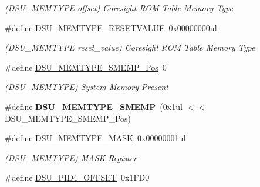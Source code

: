 \begin{DoxyCompactItemize}
\begin{DoxyCompactList}\small\item\em (D\+S\+U\+\_\+\+M\+E\+M\+T\+Y\+P\+E offset) Coresight R\+O\+M Table Memory Type \end{DoxyCompactList}\item 
\hypertarget{group___s_a_m_l21___d_s_u_gae696aac50623781af5c363bb4819a651}{}\#define \hyperlink{group___s_a_m_l21___d_s_u_gae696aac50623781af5c363bb4819a651}{D\+S\+U\+\_\+\+M\+E\+M\+T\+Y\+P\+E\+\_\+\+R\+E\+S\+E\+T\+V\+A\+L\+U\+E}~0x00000000ul\label{group___s_a_m_l21___d_s_u_gae696aac50623781af5c363bb4819a651}

\begin{DoxyCompactList}\small\item\em (D\+S\+U\+\_\+\+M\+E\+M\+T\+Y\+P\+E reset\+\_\+value) Coresight R\+O\+M Table Memory Type \end{DoxyCompactList}\item 
\hypertarget{group___s_a_m_l21___d_s_u_gaf9e3cd3a0a5383eb7790554b6b26b2d3}{}\#define \hyperlink{group___s_a_m_l21___d_s_u_gaf9e3cd3a0a5383eb7790554b6b26b2d3}{D\+S\+U\+\_\+\+M\+E\+M\+T\+Y\+P\+E\+\_\+\+S\+M\+E\+M\+P\+\_\+\+Pos}~0\label{group___s_a_m_l21___d_s_u_gaf9e3cd3a0a5383eb7790554b6b26b2d3}

\begin{DoxyCompactList}\small\item\em (D\+S\+U\+\_\+\+M\+E\+M\+T\+Y\+P\+E) System Memory Present \end{DoxyCompactList}\item 
\hypertarget{group___s_a_m_l21___d_s_u_gaab193425e2e460aea861c9c2ef10fd42}{}\#define {\bfseries D\+S\+U\+\_\+\+M\+E\+M\+T\+Y\+P\+E\+\_\+\+S\+M\+E\+M\+P}~(0x1ul $<$$<$ D\+S\+U\+\_\+\+M\+E\+M\+T\+Y\+P\+E\+\_\+\+S\+M\+E\+M\+P\+\_\+\+Pos)\label{group___s_a_m_l21___d_s_u_gaab193425e2e460aea861c9c2ef10fd42}

\item 
\hypertarget{group___s_a_m_l21___d_s_u_ga1452bd6135db23612661a14aba71c287}{}\#define \hyperlink{group___s_a_m_l21___d_s_u_ga1452bd6135db23612661a14aba71c287}{D\+S\+U\+\_\+\+M\+E\+M\+T\+Y\+P\+E\+\_\+\+M\+A\+S\+K}~0x00000001ul\label{group___s_a_m_l21___d_s_u_ga1452bd6135db23612661a14aba71c287}

\begin{DoxyCompactList}\small\item\em (D\+S\+U\+\_\+\+M\+E\+M\+T\+Y\+P\+E) M\+A\+S\+K Register \end{DoxyCompactList}\item 
\hypertarget{group___s_a_m_l21___d_s_u_ga9b2486d7ffbc473daa210a53c58ae205}{}\#define \hyperlink{group___s_a_m_l21___d_s_u_ga9b2486d7ffbc473daa210a53c58ae205}{D\+S\+U\+\_\+\+P\+I\+D4\+\_\+\+O\+F\+F\+S\+E\+T}~0x1\+F\+D0\label{group___s_a_m_l21___d_s_u_ga9b2486d7ffbc473daa210a53c58ae205}


\end{DoxyCompactItemize}
